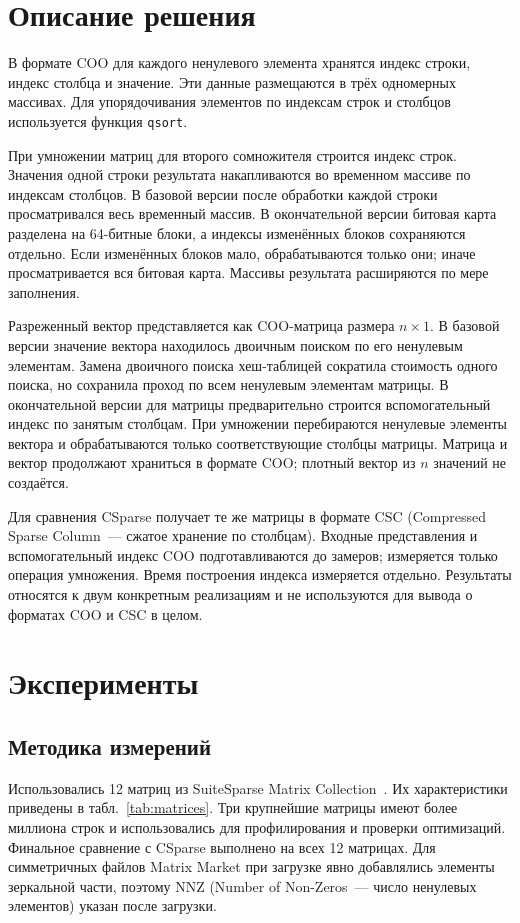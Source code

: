 \documentclass[a4paper]{article}
\begin{document}
\section{Описание решения}
В формате COO для каждого ненулевого элемента хранятся индекс строки, индекс столбца и значение. Эти данные размещаются в трёх одномерных массивах. Для упорядочивания элементов по индексам строк и столбцов используется функция \texttt{qsort}.

При умножении матриц для второго сомножителя строится индекс строк. Значения одной строки результата накапливаются во временном массиве по индексам столбцов. В базовой версии после обработки каждой строки просматривался весь временный массив. В окончательной версии битовая карта разделена на 64-битные блоки, а индексы изменённых блоков сохраняются отдельно. Если изменённых блоков мало, обрабатываются только они; иначе просматривается вся битовая карта. Массивы результата расширяются по мере заполнения.

Разреженный вектор представляется как COO-матрица размера $n\times1$. В базовой версии значение вектора находилось двоичным поиском по его ненулевым элементам. Замена двоичного поиска хеш-таблицей сократила стоимость одного поиска, но сохранила проход по всем ненулевым элементам матрицы. В окончательной версии для матрицы предварительно строится вспомогательный индекс по занятым столбцам. При умножении перебираются ненулевые элементы вектора и обрабатываются только соответствующие столбцы матрицы. Матрица и вектор продолжают храниться в формате COO; плотный вектор из $n$ значений не создаётся.

Для сравнения CSparse получает те же матрицы в формате CSC (Compressed Sparse Column~--- сжатое хранение по столбцам). Входные представления и вспомогательный индекс COO подготавливаются до замеров; измеряется только операция умножения. Время построения индекса измеряется отдельно. Результаты относятся к двум конкретным реализациям и не используются для вывода о форматах COO и CSC в целом.

\section{Эксперименты}
\subsection{Методика измерений}
Использовались 12 матриц из SuiteSparse Matrix Collection~\cite{davis2011}. Их характеристики приведены в табл.~\ref{tab:matrices}. Три крупнейшие матрицы имеют более миллиона строк и использовались для профилирования и проверки оптимизаций. Финальное сравнение с CSparse выполнено на всех 12 матрицах. Для симметричных файлов Matrix Market при загрузке явно добавлялись элементы зеркальной части, поэтому NNZ (Number of Non-Zeros~--- число ненулевых элементов) указан после загрузки.
\end{document}
